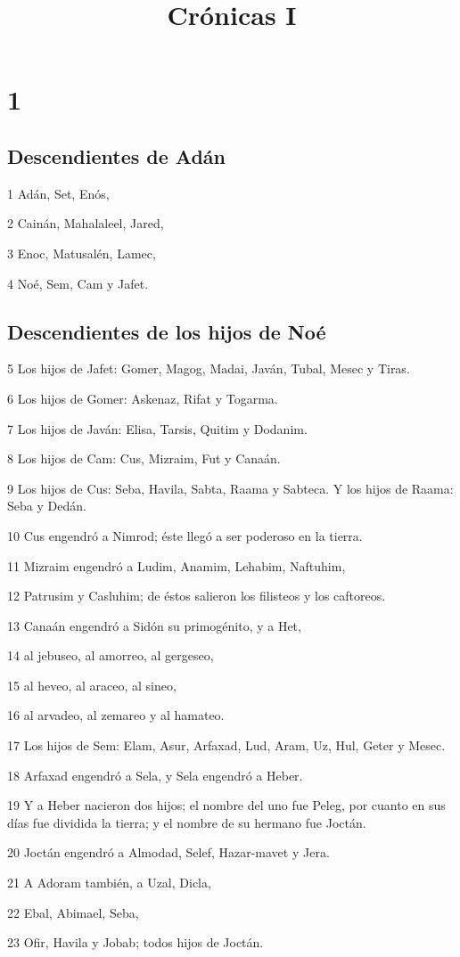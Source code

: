 

\title{Crónicas I}

\chapter{1}

\section*{Descendientes de Adán}

\par 1 Adán, Set, Enós,
\par 2 Cainán, Mahalaleel, Jared,
\par 3 Enoc, Matusalén, Lamec,
\par 4 Noé, Sem, Cam y Jafet.

\section*{Descendientes de los hijos de Noé}

\par 5 Los hijos de Jafet: Gomer, Magog, Madai, Javán, Tubal, Mesec y Tiras.
\par 6 Los hijos de Gomer: Askenaz, Rifat y Togarma.
\par 7 Los hijos de Javán: Elisa, Tarsis, Quitim y Dodanim.
\par 8 Los hijos de Cam: Cus, Mizraim, Fut y Canaán.
\par 9 Los hijos de Cus: Seba, Havila, Sabta, Raama y Sabteca. Y los hijos de Raama: Seba y Dedán.
\par 10 Cus engendró a Nimrod; éste llegó a ser poderoso en la tierra.
\par 11 Mizraim engendró a Ludim, Anamim, Lehabim, Naftuhim,
\par 12 Patrusim y Casluhim; de éstos salieron los filisteos y los caftoreos.
\par 13 Canaán engendró a Sidón su primogénito, y a Het,
\par 14 al jebuseo, al amorreo, al gergeseo,
\par 15 al heveo, al araceo, al sineo,
\par 16 al arvadeo, al zemareo y al hamateo.
\par 17 Los hijos de Sem: Elam, Asur, Arfaxad, Lud, Aram, Uz, Hul, Geter y Mesec.
\par 18 Arfaxad engendró a Sela, y Sela engendró a Heber.
\par 19 Y a Heber nacieron dos hijos; el nombre del uno fue Peleg, por cuanto en sus días fue dividida la tierra; y el nombre de su hermano fue Joctán.
\par 20 Joctán engendró a Almodad, Selef, Hazar-mavet y Jera.
\par 21 A Adoram también, a Uzal, Dicla,
\par 22 Ebal, Abimael, Seba,
\par 23 Ofir, Havila y Jobab; todos hijos de Joctán.

